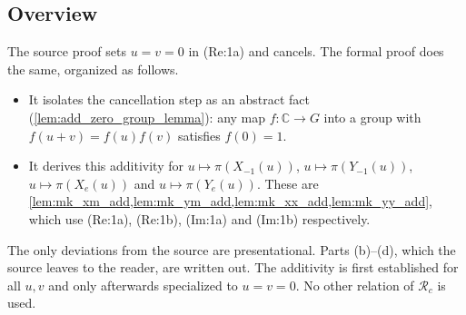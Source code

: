 \documentclass[11pt]{article}
\theoremstyle{definition}
\theoremstyle{remark}
\newcommand{\cR}{\mathcal{R}}
\newcommand{\C}{\mathbb{C}}
\begin{document}
\subsection{Overview}
The source proof sets $u=v=0$ in (Re:1a) and cancels. The formal proof does the same, organized as follows.
\begin{itemize}
\item It isolates the cancellation step as an abstract fact (\cref{lem:add_zero_group_lemma}): any map $f\colon\C\to G$ into a group with $f(u+v)=f(u)f(v)$ satisfies $f(0)=1$.
\item It derives this additivity for $u\mapsto\pi(X_{-1}(u))$, $u\mapsto\pi(Y_{-1}(u))$, $u\mapsto\pi(X_e(u))$ and $u\mapsto\pi(Y_e(u))$. These are \cref{lem:mk_xm_add,lem:mk_ym_add,lem:mk_xx_add,lem:mk_yy_add}, which use (Re:1a), (Re:1b), (Im:1a) and (Im:1b) respectively.
\end{itemize}
The only deviations from the source are presentational. Parts (b)--(d), which the source leaves to the reader, are written out. The additivity is first established for all $u,v$ and only afterwards specialized to $u=v=0$. No other relation of $\cR_c$ is used.
\end{document}
